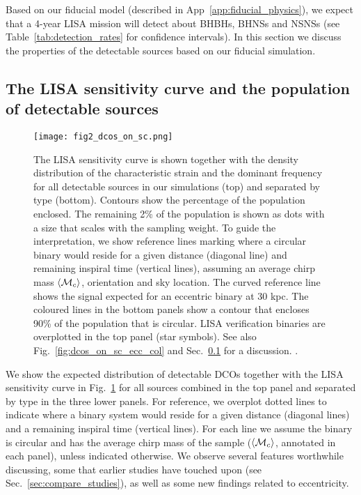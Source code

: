 Based on our fiducial model (described in App~\ref{app:fiducial_physics}), we expect that a 4-year LISA mission will detect about \BHBHFourYear{} BHBHs, \BHNSFourYear{} BHNSs and \NSNSFourYear{} NSNSs (see Table~\ref{tab:detection_rates} for confidence intervals). In this section we discuss the properties of the detectable sources based on our fiducial simulation.

\subsection{The LISA sensitivity curve and the population of detectable sources}\label{sec:dcos_on_sc}
\begin{figure*}[p]
    \centering
    \texttt{[image: fig2\_dcos\_on\_sc.png]}
    \caption{The LISA sensitivity curve is shown together with the density distribution of the characteristic strain and the dominant frequency for all detectable sources in our simulations (top) and separated by type (bottom). Contours show the percentage of the population enclosed. The remaining 2\% of the population is shown as dots with a size that scales with the sampling weight. To guide the interpretation, we show reference lines marking where a circular binary would reside for a given distance (diagonal line) and remaining inspiral time (vertical lines), assuming an average chirp mass $\left\langle\mathcal{M}_c\right\rangle$, orientation and sky location. The curved reference line shows the signal expected for an eccentric binary at 30 kpc. The coloured lines in the bottom panels show a contour that encloses 90\% of the population that is circular. LISA verification binaries are overplotted in the top panel (star symbols).  See also Fig.~\ref{fig:dcos_on_sc_ecc_col} and Sec.~\ref{sec:dcos_on_sc} for a discussion. \href{https://github.com/TomWagg/detecting-DCOs-in-LISA/blob/main/paper/figures/fig2_dcos_on_sc.png}{\faFileImage} \href{https://github.com/TomWagg/detecting-DCOs-in-LISA/blob/main/paper/figure_notebooks/sensitivity_curve.ipynb}{\faBook}.}
    \label{fig:dcos_on_sc}
\end{figure*}
We show the expected distribution of detectable DCOs together with the LISA sensitivity curve in Fig.~\ref{fig:dcos_on_sc} for all sources combined in the top panel and separated by type in the three lower panels. For reference, we overplot dotted lines to indicate where a binary system would reside for a given distance (diagonal lines) and a remaining inspiral time (vertical lines). For each line we assume the binary is circular and has the average chirp mass of the sample ($\left\langle\mathcal{M}_c\right\rangle$, annotated in each panel), unless indicated otherwise. We observe several features worthwhile discussing, some that earlier studies have touched upon (see Sec.~\ref{sec:compare_studies}), as well as some new findings related to eccentricity.

